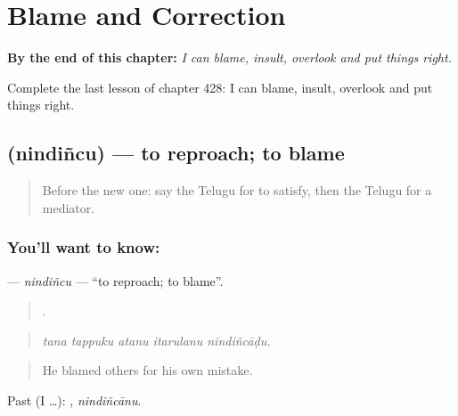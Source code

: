 
\chapter{Blame and Correction}
\label{ch:te-blame-and-correction}

\begin{chapteropening}
\textbf{By the end of this chapter:} \emph{I can blame, insult, overlook and put things right.}

Complete the last lesson of chapter 428: I can blame, insult, overlook and put things right.
\end{chapteropening}

\section[\texorpdfstring{\te{నిందించు} (nindiñcu)}{నిందించు (nindiñcu)}]{ (nindiñcu) — to reproach; to blame}

\label{lesson:TE-C428-nindincu}



\begin{quote}
Before the new one: say the Telugu for to satisfy, then the Telugu for a mediator.
\end{quote}

\subsection*{You'll want to know: }
\textbf{} — \emph{nindiñcu} — \textquotedblleft{}to reproach; to blame\textquotedblright{}.

\begin{quote}
    .
\end{quote}

\begin{quote}
\emph{tana tappuku atanu itarulanu nindiñcāḍu.}
\end{quote}

\begin{quote}
He blamed others for his own mistake.
\end{quote}

Past (I …): , \emph{nindiñcānu}.

